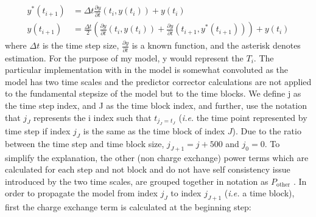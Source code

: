 \begin{align}
    y^*(t_{i+1}) &= \Delta t\frac{\partial y}{\partial t}(t_i, y(t_i)) + y(t_i)\\
    y(t_{i+1}) &= \frac{\Delta t}{2} \left(\frac{\partial y}{\partial t}(t_i, y(t_i)) + \frac{\partial y}{\partial t}(t_{i+1}, y^*(t_{i+1})) \right) + y(t_i)
\end{align}
where $\Delta t$ is the time step size, $\frac{\partial y}{\partial t}$ is a known function, and the asterisk denotes estimation. For the purpose of my model, y would represent the $T_i$. The particular implementation with in the model is somewhat convoluted as the model has two time scales and the predictor corrector calculations are not applied to the fundamental stepsize of the model but to the time blocks. We define j as the time step index, and J as the time block index, and further, use the notation that $j_{J}$ represents the i index such that $t_{j_{J} = t_{J}}$ (\textit{i.e.} the time point represented by time step if index $j_{J}$ is the same as the time block of index $J$). Due to the ratio between the time step and time block size, $j_{J+1} = j+500$ and $j_0 = 0$. To simplify the explanation, the other (non charge exchange) power terms which are calculated for each step and not block and do not have self consistency issue introduced by the two time scales, are grouped together in notation as $P_{\text{other}}$ . In order to propagate the model from index $j_J$ to index $j_{J+1}$ (\textit{i.e.} a time block), first the charge exchange term is calculated at the beginning step:

